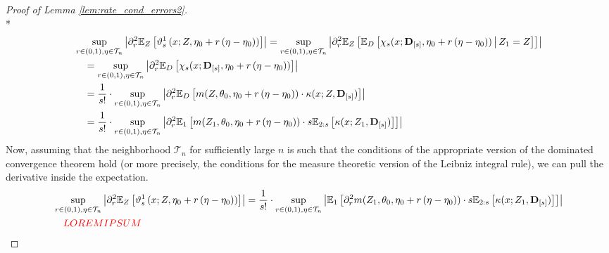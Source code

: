 \begin{proof}[Proof of Lemma \ref{lem:rate_cond_errors2}]\mbox{}\\*
    \begin{equation}
        \begin{aligned}
            & \sup_{r \in(0,1), \eta \in \mathcal{T}_{n}}\left|
                \partial_r^2 \mathbb{E}_{Z}\left[
                    \vartheta_{s}^{1}\left(x; Z, \eta_{0} + r\left(\eta-\eta_{0}\right)\right)
                \right]
            \right| 
            = \sup_{r \in(0,1), \eta \in \mathcal{T}_{n}}\left|
                \partial_r^2 \mathbb{E}_{Z}\left[
                    \mathbb{E}_{D}\left[\chi_{s}(x; \mathbf{D}_{[s]}, \eta_{0} + r\left(\eta-\eta_{0}\right)) \, \middle| \, Z_1 = Z\right]
                \right]
            \right| \\
            & \quad = \sup_{r \in(0,1), \eta \in \mathcal{T}_{n}}\left|
                \partial_r^2 \mathbb{E}_{D}\left[\chi_{s}(x; \mathbf{D}_{[s]}, \eta_{0} + r\left(\eta-\eta_{0}\right))\right]
            \right| \\
            & \quad = \frac{1}{s!} \cdot \sup_{r \in(0,1), \eta \in \mathcal{T}_{n}}\left|
                \partial_r^2  \mathbb{E}_{D}\left[
                    m(Z, \theta_{0}, \eta_{0} + r\left(\eta-\eta_{0}\right)) \cdot \kappa(x; Z, \mathbf{D}_{[s]})
                \right]
            \right| \\
            & \quad = \frac{1}{s!} \cdot \sup_{r \in(0,1), \eta \in \mathcal{T}_{n}}\left|
                \partial_r^2  \mathbb{E}_{1}\left[
                    m(Z_1, \theta_{0}, \eta_{0} + r\left(\eta-\eta_{0}\right)) \cdot s \mathbb{E}_{2:s}\left[\kappa(x; Z_{1}, \mathbf{D}_{[s]})\right]
                \right]
            \right|
        \end{aligned}
    \end{equation}
    Now, assuming that the neighborhood $\mathcal{T}_{n}$ for sufficiently large $n$ is such that the conditions of the appropriate version of the dominated convergence theorem hold (or more precisely, the conditions for the measure theoretic version of the Leibniz integral rule), we can pull the derivative inside the expectation.
    \begin{equation}
        \begin{aligned}
            & \sup_{r \in(0,1), \eta \in \mathcal{T}_{n}}\left|
                \partial_r^2 \mathbb{E}_{Z}\left[
                    \vartheta_{s}^{1}\left(x; Z, \eta_{0} + r\left(\eta-\eta_{0}\right)\right)
                \right]
            \right| 
            = \frac{1}{s!} \cdot \sup_{r \in(0,1), \eta \in \mathcal{T}_{n}}\left| \mathbb{E}_{1}\left[
                    \partial_r^2 m(Z_1, \theta_{0}, \eta_{0} + r\left(\eta-\eta_{0}\right)) \cdot s \mathbb{E}_{2:s}\left[\kappa(x; Z_{1}, \mathbf{D}_{[s]})\right]
                \right]
            \right| \\
            & \quad  {\color{red} LOREM IPSUM}
        \end{aligned}
    \end{equation}
    

\end{proof}
